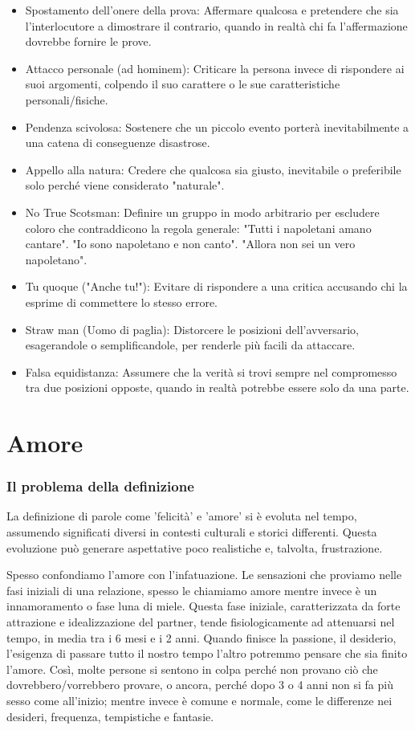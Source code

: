 \documentclass[12pt]{book} %
\begin{document}
\begin{itemize}
\item Spostamento dell’onere della prova: Affermare qualcosa e pretendere che sia l'interlocutore a dimostrare il contrario, quando in realtà chi fa l'affermazione dovrebbe fornire le prove.
\item Attacco personale (ad hominem): Criticare la persona invece di rispondere ai suoi argomenti, colpendo il suo carattere o le sue caratteristiche personali/fisiche.
\item Pendenza scivolosa: Sostenere che un piccolo evento porterà inevitabilmente a una catena di conseguenze disastrose.
\item Appello alla natura: Credere che qualcosa sia giusto, inevitabile o preferibile solo perché viene considerato "naturale".
\item No True Scotsman: Definire un gruppo in modo arbitrario per escludere coloro che contraddicono la regola generale: "Tutti i napoletani amano cantare". "Io sono napoletano e non canto". "Allora non sei un vero napoletano".
\item Tu quoque ("Anche tu!"): Evitare di rispondere a una critica accusando chi la esprime di commettere lo stesso errore.
\item Straw man (Uomo di paglia): Distorcere le posizioni dell’avversario, esagerandole o semplificandole, per renderle più facili da attaccare.
\item Falsa equidistanza: Assumere che la verità si trovi sempre nel compromesso tra due posizioni opposte, quando in realtà potrebbe essere solo da una parte.
\end{itemize}

\clearpage\section{Amore}
\subsubsection{Il problema della definizione}
La definizione di parole come 'felicità' e 'amore' si è evoluta nel tempo, assumendo significati diversi in contesti culturali e storici differenti. Questa evoluzione può generare aspettative poco realistiche e, talvolta, frustrazione.

Spesso confondiamo l'amore con l'infatuazione. Le sensazioni che proviamo nelle fasi iniziali di una relazione, spesso le chiamiamo amore mentre invece è un innamoramento o fase luna di miele. Questa fase iniziale, caratterizzata da forte attrazione e idealizzazione del partner, tende fisiologicamente ad attenuarsi nel tempo, in media tra i 6 mesi e i 2 anni. Quando finisce la passione, il desiderio, l'esigenza di passare tutto il nostro tempo l'altro potremmo pensare che sia finito l'amore. Così, molte persone si sentono in colpa perché non provano ciò che dovrebbero/vorrebbero provare, o ancora, perché dopo 3 o 4 anni non si fa più sesso come all'inizio; mentre invece è comune e normale, come le differenze nei desideri, frequenza, tempistiche e fantasie.
\end{document}

